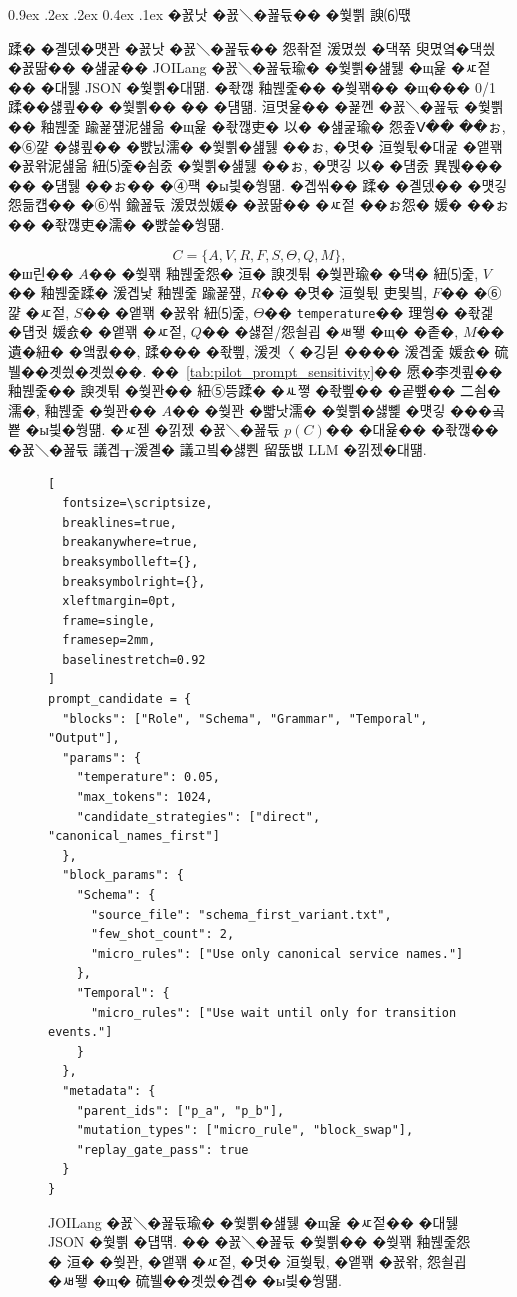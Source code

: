 \documentclass[10pt,twocolumn]{article}
\makeatletter
\renewcommand{\subsection}{\@startsection{subsection}{2}{\z@}%
{0.9ex \@plus .2ex \@minus .2ex}%
{0.4ex \@plus .1ex}%
{\normalfont\normalsize\bfseries}}
\makeatother
\begin{document}
\subsection{�꾨낫 �꾨＼�꾪듃�� �쒗쁽 諛⑹떇}

蹂� �곌뎄�먯꽌 �꾨낫 �꾨＼�꾪듃�� 怨좎젙 湲몄씠 �댁쭊 臾몄옄�댁씠 �꾨땲�� �섎굹�� JOILang �꾨＼�꾪듃瑜� �쒗쁽�섎뒗 �щ윭 �ㅼ젙�� �대뒗 JSON �쒗쁽�대떎. �좏깮 釉붾줉�� �쒖꽦�� �щ��� 0/1 蹂��섏쿂�� �쒗쁽�� �� �덈떎. 洹몃윭�� �꾩껜 �꾨＼�꾪듃 �쒗쁽�� 釉붾줉 踰꾩쟾泥섎읆 �щ윭 �좏깮吏� 以� �섎굹瑜� 怨좊Ⅴ�� ��ぉ, �⑥꺑 �섏쿂�� �뺤닔濡� �쒗쁽�섎뒗 ��ぉ, �몃� 洹쒖튃�대굹 �앹꽦 �꾨왂泥섎읆 紐⑸줉�쇰줈 �쒗쁽�섎뒗 ��ぉ, �먯깋 以� �덈줈 異붽��� �� �덈뒗 ��ぉ�� �④퍡 �ы븿�쒕떎. �곕씪�� 蹂� �곌뎄�� �먯깋 怨듦컙�� �⑥씪 鍮꾪듃 湲몄씠媛� �꾨땲�� �ㅼ젙 ��ぉ怨� 媛� ��ぉ�� �좏깮吏�濡� �뺤쓽�쒕떎.

\begin{equation}
C = \{A, V, R, F, S, \Theta, Q, M\},
\end{equation}
�ш린�� $A$�� �쒖꽦 釉붾줉怨� 洹� 諛곗튂 �쒖꽌瑜� �댁� 紐⑸줉, $V$�� 釉붾줉蹂� 湲곕낯 釉붾줉 踰꾩쟾, $R$�� �몃� 洹쒖튃 吏묓빀, $F$�� �⑥꺑 �ㅼ젙, $S$�� �앹꽦 �꾨왂 紐⑸줉, $\Theta$�� \texttt{temperature}�� 理쒕� �좏겙 �덉궛 媛숈� �앹꽦 �ㅼ젙, $Q$�� �섏젙/怨쇨굅 �ㅽ뙣 �щ� �좉�, $M$�� 遺�紐� �앸퀎��, 蹂��� �좏삎, 湲곗〈 �깅뒫 ���� 湲곕줉 媛숈� 硫뷀��곗씠�곗씠��. ��~\ref{tab:pilot_prompt_sensitivity}�� 愿�李곗쿂�� 釉붾줉�� 諛곗튂 �쒖꽌�� 紐⑤뜽蹂� �ㅻ쪟 �좏삎�� �곹뼢�� 二쇰�濡�, 釉붾줉 �쒖꽌�� $A$�� �쒖꽌 �뺣낫濡� �쒗쁽�섏뼱 �먯깋 ���곸뿉 �ы븿�쒕떎. �ㅼ젣 �낅젰 �꾨＼�꾪듃 $p(C)$�� �대윭�� �좏깮�� �꾨＼�꾪듃 議곕┰湲곌� 議고빀�섏뿬 留뚮뱺 LLM �낅젰�대떎.

\begin{figure}[t]
\centering
\begin{minipage}{0.98\columnwidth}
\begin{Verbatim}[
  fontsize=\scriptsize,
  breaklines=true,
  breakanywhere=true,
  breaksymbolleft={},
  breaksymbolright={},
  xleftmargin=0pt,
  frame=single,
  framesep=2mm,
  baselinestretch=0.92
]
prompt_candidate = {
  "blocks": ["Role", "Schema", "Grammar", "Temporal", "Output"],
  "params": {
    "temperature": 0.05,
    "max_tokens": 1024,
    "candidate_strategies": ["direct", "canonical_names_first"]
  },
  "block_params": {
    "Schema": {
      "source_file": "schema_first_variant.txt",
      "few_shot_count": 2,
      "micro_rules": ["Use only canonical service names."]
    },
    "Temporal": {
      "micro_rules": ["Use wait until only for transition events."]
    }
  },
  "metadata": {
    "parent_ids": ["p_a", "p_b"],
    "mutation_types": ["micro_rule", "block_swap"],
    "replay_gate_pass": true
  }
}
\end{Verbatim}
\end{minipage}
\caption{JOILang �꾨＼�꾪듃瑜� �쒗쁽�섎뒗 �щ윭 �ㅼ젙�� �대뒗 JSON �쒗쁽 �덉떆. �� �꾨＼�꾪듃 �쒗쁽�� �쒖꽦 釉붾줉怨� 洹� �쒖꽌, �앹꽦 �ㅼ젙, �몃� 洹쒖튃, �앹꽦 �꾨왂, 怨쇨굅 �ㅽ뙣 �щ� 硫뷀��곗씠�곕� �ы븿�쒕떎.}
\label{fig:prompt-candidate-example}
\end{figure}
\end{document}
